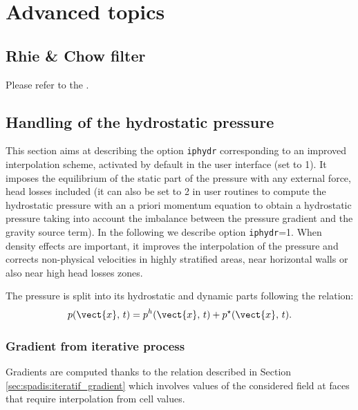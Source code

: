 \section{Advanced topics}

\subsection{Rhie \& Chow filter}

\hypertarget{arak}{}

Please refer to the .

\subsection{Handling of the hydrostatic pressure}
\label{sec:spadis:iphydr}

This section aims at describing the option \texttt{iphydr} corresponding to an
improved interpolation scheme, activated by default in the user interface (set
to 1). It imposes the equilibrium of the static part of the pressure with any
external force, head losses included (it can also be set to 2 in user routines
to compute the hydrostatic pressure with an a priori momentum equation to obtain
a hydrostatic pressure taking into account the imbalance between the pressure
gradient and the gravity source term). In the following we describe option
\texttt{iphydr}=1. When density effects are important, it improves the
interpolation of the pressure and corrects non-physical velocities in highly
stratified areas, near horizontal walls or also near high head losses zones.

The pressure is split into its hydrostatic and dynamic parts following the
relation:
\begin{equation}
        \label{eqn:ph}
    p(\vect{x}, \, t ) = p^h(\vect{x}, \, t) + p^\star(\vect{x}, \, t).
\end{equation}

\subsubsection{Gradient from iterative process} Gradients are computed thanks
to the relation described in Section \ref{sec:spadis:iteratif_gradient} which
involves values of the considered field at faces that require interpolation
from cell values.

